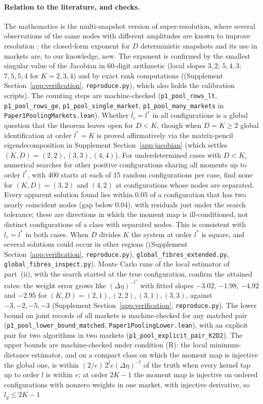 \documentclass[12pt]{article}
\theoremstyle{definition}
\theoremstyle{remark}
\begin{document}
\paragraph{Relation to the literature, and checks.} The mathematics is the multi-snapshot version of super-resolution, where several observations of the same nodes with different amplitudes are known to improve resolution \citep{li2022}; the closed-form exponent for $D$ deterministic snapshots and its use in markets are, to our knowledge, new. The exponent is confirmed by the smallest singular value of the Jacobian in 60-digit arithmetic (local slopes $3,2$; $5,4,3$; $7,5,5,4$ for $K=2,3,4$) and by exact rank computations ((Supplement Section~\ref{app:verification}, \nolinkurl{reproduce.py}), which also holds the calibration scripts). The counting steps are machine-checked (\texttt{p1\_pool\_rows\_lt}, \texttt{p1\_pool\_rows\_ge}, \texttt{p1\_pool\_single\_market}, \texttt{p1\_pool\_many\_markets} in \nolinkurl{Paper1PoolingMarkets.lean}). Whether $l_c=l^*$ in all configurations is a global question that the theorem leaves open for $D < K$, though when $D=K\ge2$ global identification at order $l^*=K$ is proved affirmatively via the matrix-pencil eigendecomposition in Supplement Section~\ref{app:jacobian} (which settles $(K,D)=(2,2), (3,3), (4,4)$). For underdetermined cases with $D < K$, numerical searches for other positive configurations sharing all moments up to order $l^*$, with 400 starts at each of 15 random configurations per case, find none for $(K,D)=(3,2)$ and $(4,2)$ at configurations whose nodes are separated. Every apparent solution found lies within $0.05$ of a configuration that has two nearly coincident nodes (gap below $0.04$), with residuals just under the search tolerance; these are directions in which the moment map is ill-conditioned, not distinct configurations of a class with separated nodes. This is consistent with $l_c=l^*$ in both cases. When $D$ divides $K$ the system at order $l^*$ is square, and several solutions could occur in other regions ((Supplement Section~\ref{app:verification}, \nolinkurl{reproduce.py}), \nolinkurl{global_fibres_extended.py}, \nolinkurl{global_fibres_inspect.py}). Monte Carlo runs of the local estimator of part~(ii), with the search started at the true configuration, confirm the attained rates: the weight error grows like $(\Delta\eta)^{-l^*}$ with fitted slopes $-3.02$, $-1.98$, $-4.92$ and $-2.95$ for $(K,D)=(2,1),(2,2),(3,1),(3,3)$, against $-3,-2,-5,-3$ (Supplement Section~\ref{app:verification}, \nolinkurl{reproduce.py}). The lower bound on joint records of all markets is machine-checked for any matched pair (\texttt{p1\_pool\_lower\_bound\_matched}, \nolinkurl{Paper1PoolingLower.lean}), with an explicit pair for two algorithms in two markets (\texttt{p1\_pool\_explicit\_pair\_K2D2}). The upper bounds are machine-checked under condition (R): the local minimum-distance estimator, and on a compact class on which the moment map is injective the global one, is within $(2/c)\,2^l e(\Delta\eta)^{-l}$ of the truth when every kernel tap up to order $l$ is within $e$; at order $2K-1$ the moment map is injective on ordered configurations with nonzero weights in one market, with injective derivative, so $l_g\le2K-1$ 
\end{document}
